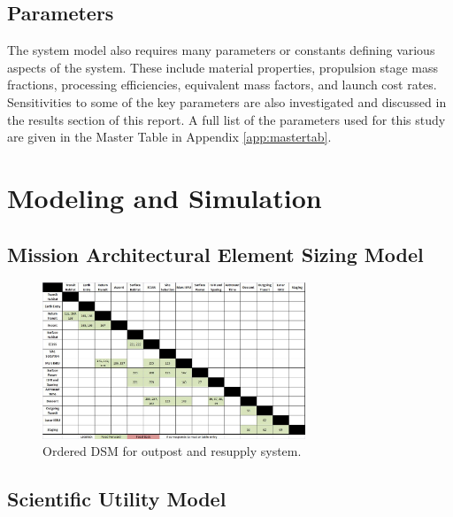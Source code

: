 \documentclass[]{aiaa-pretty}
\begin{document}
\subsection{Parameters}
\label{sec:params}
The system model also requires many parameters or constants defining various aspects of the system. These include material properties, propulsion stage mass fractions, processing efficiencies, equivalent mass factors, and launch cost rates. Sensitivities to some of the key parameters are also investigated and discussed in the results section of this report. A full list of the parameters used for this study are given in the Master Table in Appendix \ref{app:mastertab}. 

\section{Modeling and Simulation}
\label{sec:model}

\subsection{Mission Architectural Element Sizing Model}
\begin{figure}[h!]
	\centering
	\includegraphics[width=0.7\textwidth]{OrderedDSM}
	\caption{Ordered DSM for outpost and resupply system.}
	\label{fig:orderedDSM}
\end{figure}


\subsection{Scientific Utility Model}
\end{document}
